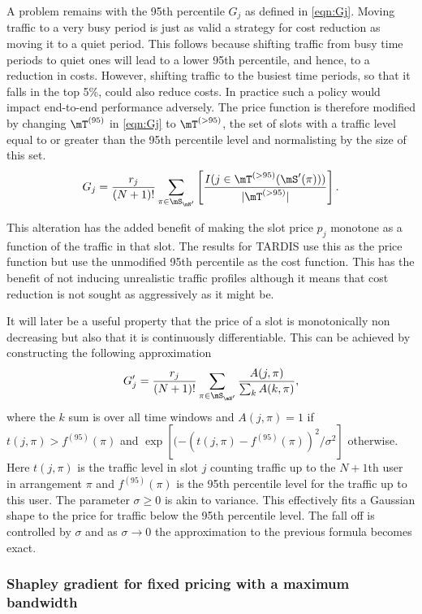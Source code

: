 A problem remains with the 95th percentile $G_j$ as defined in \eqref{eqn:Gj}.  
Moving traffic to a very busy period is just as valid a strategy for 
cost reduction as moving it to a quiet period.  
This follows because shifting traffic from busy time periods to quiet
ones will lead to a lower 95th percentile, and hence, to a reduction in costs.  
However, shifting traffic to the busiest time periods, so that it 
falls in the top 5\%, could also reduce costs.
In practice such a policy would impact end-to-end performance adversely.
The price function is therefore modified by changing $\mT^{(95)}$ 
in \eqref{eqn:Gj} to $\mT^{(>95)}$, the set of slots with a traffic 
level equal to or greater than the 95th percentile level and 
normalisting by the size of this set.
$$
G_j = \frac{r_j}{ (N+1)!} \sum_{\pi \in \mS_{\mN'}} 
\left[\frac{I (j \in \mT^{(>95)}(\mS'(\pi)))}
{|\mT^{(>95)}|}
\right].
$$

  
This alteration has the added benefit of making the slot price $p_j$ 
monotone as a function of the traffic in that slot.  The results
for TARDIS use this as the price function but use the unmodified 
95th percentile as the cost function.  This has the benefit of not
inducing unrealistic traffic profiles although it means that cost
reduction is not sought as aggressively as it might be.

It will later be a useful property that the price
of a slot is monotonically non decreasing but also that it is continuously 
differentiable.  This can be achieved by constructing the following
approximation 
\begin{equation}
G'_j = \frac{r_j}{ (N+1)!} \sum_{\pi \in \mS_{\mN'}}
\frac{A(j,\pi)}{\sum_{k} A(k,\pi)},
\label{eqn:Gjdash}
\end{equation}
where the $k$ sum is over all time windows and
$A(j,\pi) = 1$
if $t(j,\pi) > f^{(95)}(\pi)$ and
$\exp[(-(t(j,\pi)- f^{(95)}(\pi))^2/\sigma^2]$ otherwise.
Here $t(j,\pi)$ is the traffic level in slot $j$ counting traffic up to the $N+1$th user in arrangement $\pi$ and $f^{(95)}(\pi)$ is the 95th percentile level for the traffic up to this user.
The parameter $\sigma \geq 0$ is akin to variance.  This effectively fits a Gaussian shape to the price for traffic below the 95th percentile level.  The fall off is controlled by $\sigma$ and as $\sigma \rightarrow 0$ the approximation 
to the previous formula becomes exact. 

\subsubsection{Shapley gradient for fixed pricing with a maximum bandwidth}
\label{sec:fixed_price}

